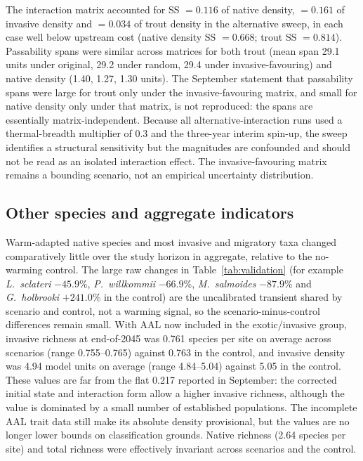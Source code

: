 \documentclass[11pt,a4paper]{article}
\begin{document}
The interaction matrix accounted for SS $=0.116$ of native density, $=0.161$ of invasive density and $=0.034$ of trout density in the alternative sweep, in each case well below upstream cost (native density SS $=0.668$; trout SS $=0.814$). Passability spans were similar across matrices for both trout (mean span 29.1 units under original, 29.2 under random, 29.4 under invasive-favouring) and native density (1.40, 1.27, 1.30 units). The September statement that passability spans were large for trout only under the invasive-favouring matrix, and small for native density only under that matrix, is not reproduced: the spans are essentially matrix-independent. Because all alternative-interaction runs used a thermal-breadth multiplier of 0.3 and the three-year interim spin-up, the sweep identifies a structural sensitivity but the magnitudes are confounded and should not be read as an isolated interaction effect. The invasive-favouring matrix remains a bounding scenario, not an empirical uncertainty distribution.

\subsection{Other species and aggregate indicators}

Warm-adapted native species and most invasive and migratory taxa changed comparatively little over the study horizon in aggregate, relative to the no-warming control. The large raw changes in Table~\ref{tab:validation} (for example \textit{L.~sclateri} $-45.9$\%, \textit{P.~willkommii} $-66.9$\%, \textit{M.~salmoides} $-87.9$\% and \textit{G.~holbrooki} $+241.0$\% in the control) are the uncalibrated transient shared by scenario and control, not a warming signal, so the scenario-minus-control differences remain small. With AAL now included in the exotic/invasive group, invasive richness at end-of-2045 was 0.761 species per site on average across scenarios (range 0.755--0.765) against 0.763 in the control, and invasive density was 4.94 model units on average (range 4.84--5.04) against 5.05 in the control. These values are far from the flat 0.217 reported in September: the corrected initial state and interaction form allow a higher invasive richness, although the value is dominated by a small number of established populations. The incomplete AAL trait data still make its absolute density provisional, but the values are no longer lower bounds on classification grounds. Native richness (2.64 species per site) and total richness were effectively invariant across scenarios and the control.
\end{document}
